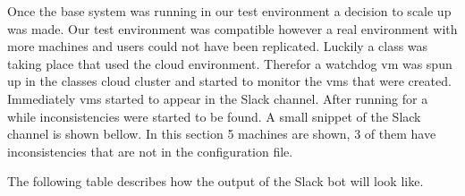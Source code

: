 \documentclass[12pt]{article}
\begin{document}
Once the base system was running in our test environment a decision to scale up was made. Our test environment was compatible however a real environment with more machines and users could not have been replicated. Luckily a class was taking place that used the cloud environment. Therefor a watchdog vm was spun up in the classes cloud cluster and started to monitor the vms that were created. Immediately vms started to appear in the Slack channel. After running for a while inconsistencies were started to be found. A small snippet of the Slack channel is shown bellow. In this section 5 machines are shown, 3 of them have inconsistencies that are not in the configuration file.

The following table describes how the output of the Slack bot will look like. 

\begin{table}[H]
\centering
\caption{Slack Ouput Breakdown}
\label{Slack Ouput Breakdown}
\end{table}
\end{document}
